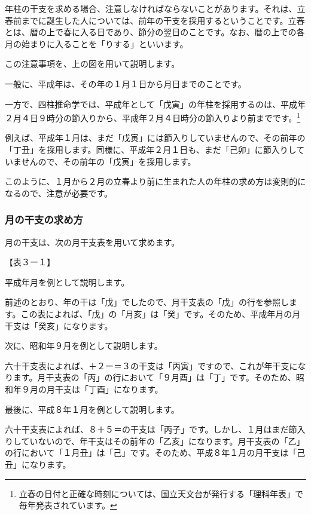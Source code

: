 \documentclass[a5paper,11pt,dvipdfmx]{tarticle}
\begin{document}
年柱の干支を求める場合、注意しなければならないことがあります。それは、立春前までに誕生した人については、前年の干支を採用するということです。立春とは、暦の上で春に入る日であり、節分の翌日のことです。なお、暦の上での各月の始まりに入ることを「りする」といいます。

この注意事項を、上の図を用いて説明します。

一般に、平成年は、その年の１月１日から月日までのことです。

一方で、四柱推命学では、平成年として「戊寅」の年柱を採用するのは、平成年２月４日９時分の節入りから、平成年２月４日時分の節入りより前までです。\footnote{立春の日付と正確な時刻については、国立天文台が発行する「理科年表」で毎年発表されています。}

例えば、平成年１月は、まだ「戊寅」には節入りしていませんので、その前年の「丁丑」を採用します。同様に、平成年２月１日も、まだ「己卯」に節入りしていませんので、その前年の「戊寅」を採用します。

このように、１月から２月の立春より前に生まれた人の年柱の求め方は変則的になるので、注意が必要です。


\subsubsection*{月の干支の求め方}

月の干支は、次の月干支表を用いて求めます。

【表３ー１】

平成年月を例として説明します。

前述のとおり、年の干は「戊」でしたので、月干支表の「戊」の行を参照します。この表によれば、「戊」の「月亥」は「癸」です。そのため、平成年月の月干支は「癸亥」になります。

次に、昭和年９月を例として説明します。

六十干支表によれば、＋２ー＝３の干支は「丙寅」ですので、これが年干支になります。月干支表の「丙」の行において「９月酉」は「丁」です。そのため、昭和年９月の月干支は「丁酉」になります。

最後に、平成８年１月を例として説明します。

六十干支表によれば、８＋５＝の干支は「丙子」です。しかし、１月はまだ節入りしていないので、年干支はその前年の「乙亥」になります。月干支表の「乙」の行において「１月丑」は「己」です。そのため、平成８年１月の月干支は「己丑」になります。
\end{document}
